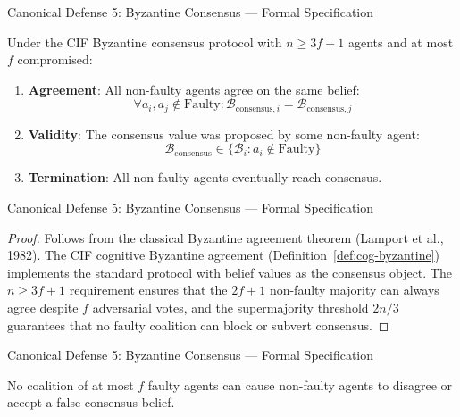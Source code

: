 \documentclass[
  ignorenonframetext,
]{beamer}
\begin{document}
\begin{frame}[allowframebreaks]{Canonical Defense 5: Byzantine Consensus
--- Formal Specification}
\protect{}\label{canonical-defense-5-byzantine-consensus-formal-specification}
\begin{theorem}
\label{thm:cog-byz-agreement}
Under the CIF Byzantine consensus protocol with $n \geq 3f+1$ agents and at most $f$ compromised:
\begin{enumerate}
\item \textbf{Agreement}: All non-faulty agents agree on the same belief:
\begin{equation}
\label{eq:byz-agreement}
\forall a_i, a_j \notin \text{Faulty}: \mathcal{B}_{\text{consensus},i} = \mathcal{B}_{\text{consensus},j}
\end{equation}
\item \textbf{Validity}: The consensus value was proposed by some non-faulty agent:
\begin{equation}
\label{eq:byz-validity}
\mathcal{B}_{\text{consensus}} \in \{\mathcal{B}_i : a_i \notin \text{Faulty}\}
\end{equation}
\item \textbf{Termination}: All non-faulty agents eventually reach consensus.
\end{enumerate}
\end{theorem}

\end{frame}

\begin{frame}[allowframebreaks]{Canonical Defense 5: Byzantine Consensus
--- Formal Specification}
\begin{proof}
Follows from the classical Byzantine agreement theorem (Lamport et al., 1982). The CIF cognitive Byzantine agreement (Definition~\ref{def:cog-byzantine}) implements the standard protocol with belief values as the consensus object. The $n \geq 3f+1$ requirement ensures that the $2f+1$ non-faulty majority can always agree despite $f$ adversarial votes, and the supermajority threshold $2n/3$ guarantees that no faulty coalition can block or subvert consensus.
\end{proof}

\end{frame}

\begin{frame}[allowframebreaks]{Canonical Defense 5: Byzantine Consensus
--- Formal Specification}
\begin{corollary}
\label{cor:consensus-resistance}
No coalition of at most $f$ faulty agents can cause non-faulty agents to disagree or accept a false consensus belief.
\end{corollary}

\end{frame}
\end{document}
